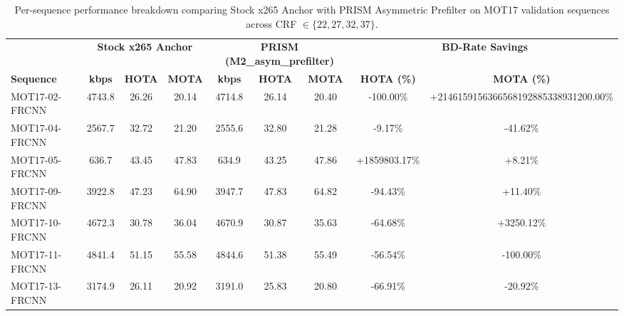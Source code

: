 \begin{table}[t]
\centering
\caption{Per-sequence performance breakdown comparing Stock x265 Anchor with PRISM Asymmetric Prefilter on MOT17 validation sequences across CRF $\in \{22, 27, 32, 37\}$.}
\label{tab:mot17_per_sequence}
\small
\begin{tabular}{lcccccccc}
\toprule
 & \multicolumn{3}{c}{\textbf{Stock x265 Anchor}} & \multicolumn{3}{c}{\textbf{PRISM (M2\_asym\_prefilter)}} & \multicolumn{2}{c}{\textbf{BD-Rate Savings}} \\
\cmidrule(lr){2-4} \cmidrule(lr){5-7} \cmidrule(lr){8-9}
\textbf{Sequence} & \textbf{kbps} & \textbf{HOTA} & \textbf{MOTA} & \textbf{kbps} & \textbf{HOTA} & \textbf{MOTA} & \textbf{HOTA (\%)} & \textbf{MOTA (\%)} \\
\midrule
MOT17-02-FRCNN & 4743.8 & 26.26 & 20.14 & 4714.8 & 26.14 & 20.40 & -100.00\% & +2146159156366568192885338931200.00\% \\
MOT17-04-FRCNN & 2567.7 & 32.72 & 21.20 & 2555.6 & 32.80 & 21.28 & -9.17\% & -41.62\% \\
MOT17-05-FRCNN & 636.7 & 43.45 & 47.83 & 634.9 & 43.25 & 47.86 & +1859803.17\% & +8.21\% \\
MOT17-09-FRCNN & 3922.8 & 47.23 & 64.90 & 3947.7 & 47.83 & 64.82 & -94.43\% & +11.40\% \\
MOT17-10-FRCNN & 4672.3 & 30.78 & 36.04 & 4670.9 & 30.87 & 35.63 & -64.68\% & +3250.12\% \\
MOT17-11-FRCNN & 4841.4 & 51.15 & 55.58 & 4844.6 & 51.38 & 55.49 & -56.54\% & -100.00\% \\
MOT17-13-FRCNN & 3174.9 & 26.11 & 20.92 & 3191.0 & 25.83 & 20.80 & -66.91\% & -20.92\% \\
\bottomrule
\end{tabular}
\end{table}
